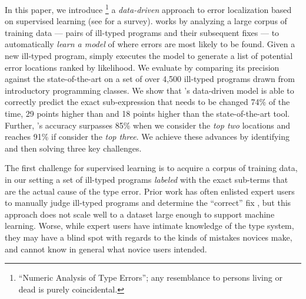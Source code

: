 %
In this paper, we introduce \toolname
\footnote{``Numeric Analysis of Type Errors''; any resemblance to persons living or dead is purely coincidental.}
a \emph{data-driven} approach to error
localization based on supervised
learning (see \citealt{Kotsiantis2007-pj} for a survey).
%
\toolname works by analyzing a large corpus
of training data --- pairs of ill-typed
programs and their subsequent fixes ---
to automatically \emph{learn a model}
of where errors are most likely to
be found.
%
Given a new ill-typed program,
\toolname simply executes the model
to generate a list of potential error
locations ranked by likelihood.
%
We evaluate \toolname by comparing its
precision against the state-of-the-art
on a set of over 4,500 ill-typed \ocaml
programs drawn from introductory
programming classes.
%
We show that \toolname's data-driven
model is able to correctly predict
the exact sub-expression that needs to
be changed 74\% of the time,
29 points higher than \ocaml and
18 points higher than the state-of-the-art
\sherrloc tool.
%
Further, \toolname's accuracy surpasses
85\% when we consider the \emph{top two}
locations and reaches 91\% if consider
the \emph{top three}.
%
We achieve these advances by identifying
and then solving three key challenges.

%
The first challenge for supervised learning
is to acquire a corpus of training data, in our setting
a set of ill-typed programs \emph{labeled}
with the exact sub-terms that are the actual
cause of the type error.
%
Prior work has often enlisted expert users
to manually judge ill-typed programs and
determine the ``correct'' fix
\citep[\eg][]{Lerner2007-dt,Loncaric2016-uk},
but this approach does not scale well to
a dataset large enough to support machine
learning.
%
Worse, while expert users have intimate
knowledge of the type system, they may
have a blind spot with regards to the
kinds of mistakes novices make, and
cannot know in general what novice users
intended.


